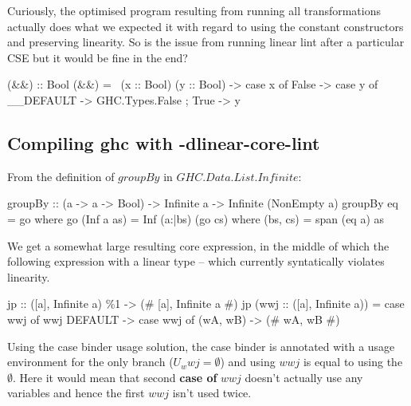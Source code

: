 \documentclass[a4paper, draft]{report}
\begin{document}
Curiously, the optimised program resulting from running all transformations
actually does what we expected it with regard to using the constant constructors
and preserving linearity. So is the issue from running linear lint after a
particular CSE but it would be fine in the end?
\begin{code}
(&&) :: Bool %
(&&) = \ (x :: Bool) (y :: Bool) ->
  case x of {
    False -> case y of { __DEFAULT -> GHC.Types.False };
    True -> y
  }
\end{code}

\subsection{Compiling ghc with -dlinear-core-lint}

From the definition of $\mathit{groupBy}$ in $\mathit{GHC.Data.List.Infinite}$:

\begin{code}
groupBy :: (a -> a -> Bool) -> Infinite a -> Infinite (NonEmpty a)
groupBy eq = go
  where
    go (Inf a as) = Inf (a:|bs) (go cs)
      where (bs, cs) = span (eq a) as
\end{code}

We get a somewhat large resulting core expression, in the middle of which the
following expression with a linear type -- which currently syntatically violates
linearity.

\begin{code}
jp :: ([a], Infinite a) \%1 -> (# [a], Infinite a #)
jp (wwj :: ([a], Infinite a)) =
    case wwj of wwj {
        DEFAULT -> case wwj of { (wA, wB) -> (# wA, wB #) }
    }
\end{code}

Using the case binder usage solution, the case binder is annotated with a usage
environment for the only branch ($U_wwj = \emptyset$) and using $wwj$ is equal
to using the $\emptyset$. Here it would mean that second \textbf{case of} $wwj$
doesn't actually use any variables and hence the first $wwj$ isn't used twice.


\end{document}
